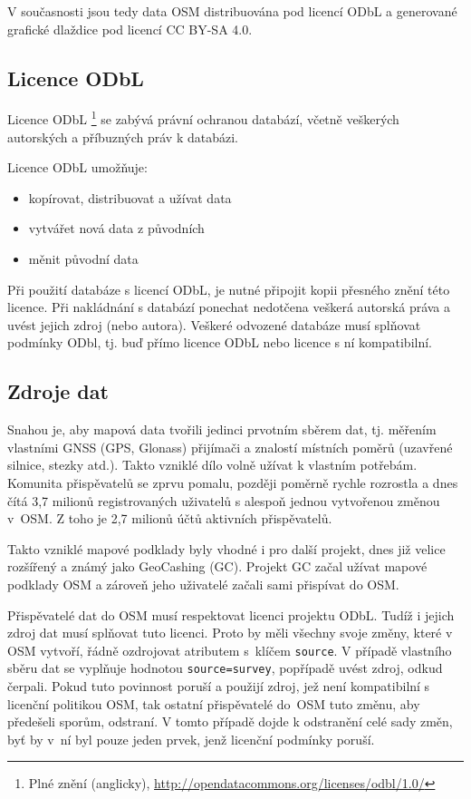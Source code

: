 V současnosti jsou tedy data OSM distribuována pod licencí ODbL a
generované grafické dlaždice pod licencí CC BY-SA 4.0. \cite{OSMlicence}

\subsection{Licence ODbL}
Licence ODbL \footnote{Plné znění (anglicky), \url{http://opendatacommons.org/licenses/odbl/1.0/}}
se zabývá právní ochranou databází, včetně
veškerých autorských a příbuzných práv k databázi.

Licence ODbL umožňuje:
\begin{itemize}
    \item    kopírovat, distribuovat a užívat data
    \item    vytvářet nová data z původních
    \item    měnit původní data
\end{itemize}

Při použití databáze s licencí ODbL, je
nutné připojit kopii přesného znění této licence.
Při nakládnání s databází ponechat nedotčena veškerá autorská práva a
uvést jejich zdroj (nebo autora).
Veškeré odvozené databáze musí splňovat podmínky ODbl,
tj. buď přímo licence ODbL nebo licence s ní kompatibilní.
\cite{Nesetril2013thesis}

\subsection{Zdroje dat}
\label{Zdroje dat}
Snahou je, aby mapová data tvořili jedinci prvotním
sběrem dat, tj. měřením vlastními GNSS (GPS, Glonass) přijímači a
znalostí místních poměrů (uzavřené silnice, stezky atd.).  Takto
vzniklé dílo volně užívat k vlastním potřebám. Komunita přispěvatelů se
zprvu pomalu, později poměrně rychle rozrostla a dnes čítá 3,7 milionů
registrovaných uživatelů s alespoň jednou vytvořenou změnou v~OSM. Z toho je 2,7 milionů účtů aktivních přispěvatelů.\cite{OSMstats}

Takto vzniklé mapové podklady byly vhodné i pro další projekt, dnes již
velice rozšířený a známý jako GeoCashing (GC). Projekt GC začal užívat mapové
podklady OSM a zároveň jeho uživatelé začali sami přispívat do OSM. 

Přispěvatelé dat do OSM musí respektovat licenci projektu ODbL.
Tudíž i jejich zdroj dat musí splňovat tuto licenci. Proto by měli
všechny svoje změny, které v OSM vytvoří, řádně ozdrojovat atributem
s~klíčem 
{\tt source}.
V případě vlastního sběru dat se vyplňuje hodnotou
{\tt source=survey},
popřípadě uvést zdroj, odkud čerpali. Pokud tuto povinnost poruší a
použijí zdroj, jež není kompatibilní s licenční politikou OSM, tak ostatní 
přispěvatelé do~OSM tuto změnu, aby předešeli sporům, odstraní. 
V tomto případě dojde k odstranění celé sady změn, byť by v~ní byl pouze jeden prvek, jenž licenční podmínky poruší.

